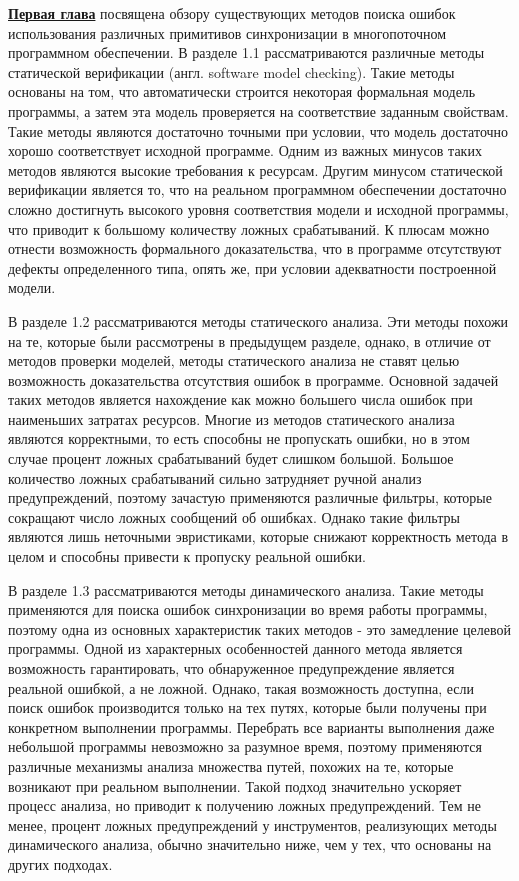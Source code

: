 \underline{\textbf{Первая глава}} посвящена обзору существующих методов поиска ошибок использования различных примитивов синхронизации в многопоточном программном обеспечении.
В разделе 1.1 рассматриваются различные методы статической верификации (англ. software model checking).
Такие методы основаны на том, что автоматически строится некоторая формальная модель программы, а затем эта модель проверяется на соответствие заданным свойствам.
Такие методы являются достаточно точными при условии, что модель достаточно хорошо соответствует исходной программе.
Одним из важных минусов таких методов являются высокие требования к ресурсам.
Другим минусом статической верификации является то, что на реальном программном обеспечении достаточно сложно достигнуть высокого уровня соответствия модели и исходной программы, что приводит к большому количеству ложных срабатываний.
К плюсам можно отнести возможность формального доказательства, что в программе отсутствуют дефекты определенного типа, опять же, при условии адекватности построенной модели.

В разделе 1.2 рассматриваются методы статического анализа.
Эти методы похожи на те, которые были рассмотрены в предыдущем разделе, однако, в отличие от методов проверки моделей, методы статического анализа не ставят целью возможность доказательства отсутствия ошибок в программе.
Основной задачей таких методов является нахождение как можно большего числа ошибок при наименьших затратах ресурсов. 
Многие из методов статического анализа являются корректными, то есть способны не пропускать ошибки, но в этом случае процент ложных срабатываний будет слишком большой.
Большое количество ложных срабатываний сильно затрудняет ручной анализ предупреждений, поэтому зачастую применяются различные фильтры, которые сокращают число ложных сообщений об ошибках.
Однако такие фильтры являются лишь неточными эвристиками, которые снижают корректность метода в целом и способны привести к пропуску реальной ошибки.

В разделе 1.3 рассматриваются методы динамического анализа.
Такие методы применяются для поиска ошибок синхронизации во время работы программы, поэтому одна из основных характеристик таких методов - это замедление целевой программы. 
Одной из характерных особенностей данного метода является возможность гарантировать, что обнаруженное предупреждение является реальной ошибкой, а не ложной. 
Однако, такая возможность доступна, если поиск ошибок производится только на тех путях, которые были получены при конкретном выполнении программы.
Перебрать все варианты выполнения даже небольшой программы невозможно за разумное время, поэтому применяются различные механизмы анализа множества путей, похожих на те, которые возникают при реальном выполнении.
Такой подход значительно ускоряет процесс анализа, но приводит к получению ложных предупреждений. 
Тем не менее, процент ложных предупреждений у инструментов, реализующих методы динамического анализа, обычно значительно ниже, чем у тех, что основаны на других подходах.

